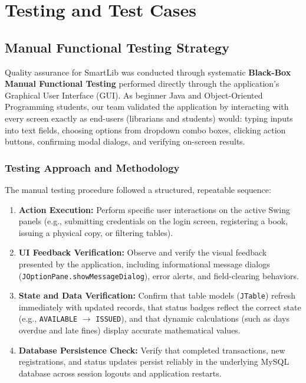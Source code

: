 \chapter{Testing and Test Cases}

\section{Manual Functional Testing Strategy}
Quality assurance for SmartLib was conducted through systematic \textbf{Black-Box Manual Functional Testing} performed directly through the application's Graphical User Interface (GUI). As beginner Java and Object-Oriented Programming students, our team validated the application by interacting with every screen exactly as end-users (librarians and students) would: typing inputs into text fields, choosing options from dropdown combo boxes, clicking action buttons, confirming modal dialogs, and verifying on-screen results.

\subsection{Testing Approach and Methodology}
The manual testing procedure followed a structured, repeatable sequence:
\begin{enumerate}
    \item \textbf{Action Execution:} Perform specific user interactions on the active Swing panels (e.g., submitting credentials on the login screen, registering a book, issuing a physical copy, or filtering tables).
    \item \textbf{UI Feedback Verification:} Observe and verify the visual feedback presented by the application, including informational message dialogs (\texttt{JOptionPane.showMessageDialog}), error alerts, and field-clearing behaviors.
    \item \textbf{State and Data Verification:} Confirm that table models (\texttt{JTable}) refresh immediately with updated records, that status badges reflect the correct state (e.g., \texttt{AVAILABLE} $\to$ \texttt{ISSUED}), and that dynamic calculations (such as days overdue and late fines) display accurate mathematical values.
    \item \textbf{Database Persistence Check:} Verify that completed transactions, new registrations, and status updates persist reliably in the underlying MySQL database across session logouts and application restarts.
\end{enumerate}

